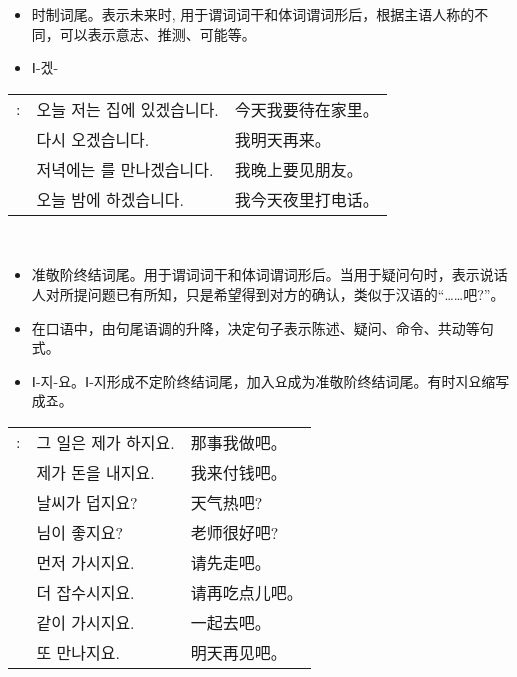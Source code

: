 \begin{grammar}
	\begin{grammarsect}[-겠-]
		\begin{itemize}
			\item 时制词尾。表示未来时, 用于谓词词干和体词谓词形后，根据主语人称的不同，可以表示意志、推测、可能等。
			\item {\color{gray} Ⅰ-겠-}
		\end{itemize}
		\begin{tabular}{lll}
			\ruby{例}{예}: & 오늘 저는 집에 있겠습니다.             & 今天我要待在家里。 \\
			             & \ruby{來日}{내일} 다시 오겠습니다.     & 我明天再来。    \\
			             & 저녁에는 \ruby{親舊}{친구}를 만나겠습니다. & 我晚上要见朋友。  \\
			             & 오늘 밤에 \ruby{電話}{전화}하겠습니다.   & 我今天夜里打电话。
		\end{tabular}\\
	\end{grammarsect}
	\begin{grammarsect}[-지요]
		\begin{itemize}
			\item 准敬阶终结词尾。用于谓词词干和体词谓词形后。当用于疑问句时，表示说话人对所提问题已有所知，只是希望得到对方的确认，类似于汉语的“……吧?”。
			\item 在口语中，由句尾语调的升降，决定句子表示陈述、疑问、命令、共动等句式。
			\item {\color{gray} Ⅰ-지-요。Ⅰ-지形成不定阶终结词尾，加入요成为准敬阶终结词尾。有时지요缩写成죠。}
		\end{itemize}
		\begin{tabular}{lll}
			\ruby{例}{예}: & 그 일은 제가 하지요.          & 那事我做吧。  \\
			             & 제가 돈을 내지요.            & 我来付钱吧。  \\
			             & 날씨가 덥지요?              & 天气热吧?   \\
			             & \ruby{先生}{선생}님이 좋지요?  & 老师很好吧?  \\
			             & 먼저 가시지요.              & 请先走吧。   \\
			             & 더 잡수시지요.              & 请再吃点儿吧。 \\
			             & 같이 가시지요.              & 一起去吧。   \\
			             & \ruby{來日}{내일} 또 만나지요. & 明天再见吧。  \\
		\end{tabular}\\
	\end{grammarsect}
\end{grammar}
